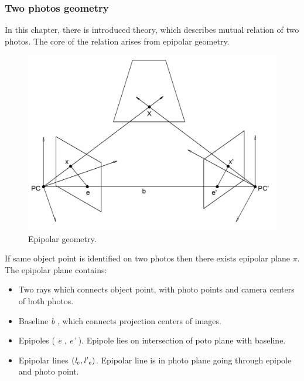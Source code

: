 \documentclass[a4paper,12pt]{article}
\newcommand{\escal}[1]{
{\it #1}
}
\begin{document}
\subsubsection{Two photos geometry}



In this chapter, there is introduced theory, which describes mutual relation of two photos. 
The core of the relation arises from epipolar geometry.

\begin{figure}[h]
    \centering
    \includegraphics[scale=0.3]{figures/epipolar.png}
    \caption{Epipolar geometry.}
    \label{fig:epipolae}
\end{figure}


If same object point is identified on two photos then there exists epipolar plane $\pi$.
The epipolar plane contains:


\begin{itemize}
\item Two rays which connects object point, with photo points and camera centers of both photos.
\item Baseline \escal{b}, which connects projection centers of images.
\item Epipoles (\escal{e}, \escal{e'}). Epipole lies on intersection of poto plane with baseline.
\item Epipolar lines  $(\escal{l}_{e}, \escal{l'}_{e})$. Epipolar line is in photo plane going through epipole and photo point.
\end{itemize}
\end{document}
